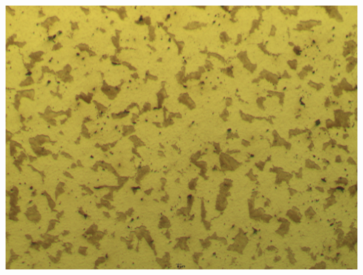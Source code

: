 \documentclass[german,  %
parskip=full,  %
]{scrartcl}
\begin{document}
\begin{minipage}{0.1\textwidth}\centering
\[\]
\end{minipage}
\begin{minipage}{0.45\textwidth}\centering
\includegraphics[scale=0.1]{St_1Sch_5s_20x_001.jpg}
\end{minipage} \\\\
\end{document}
